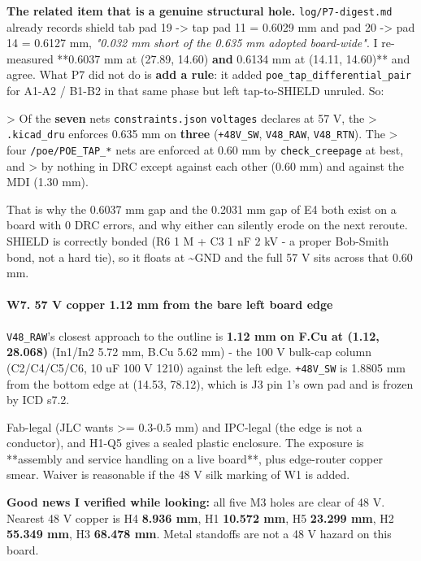 \documentclass[11pt,a4paper]{article}
\begin{document}
\textbf{The related item that is a genuine structural hole.} \texttt{log/P7-digest.md} already records shield tab pad 19 -\textgreater{} tap pad 11 = 0.6029 mm and pad 20 -\textgreater{} pad 14 = 0.6127 mm, \emph{"0.032 mm short of the 0.635 mm adopted board-wide"}. I re-measured {*}{*}0.6037 mm at (27.89, 14.60)\textbf{ and }0.6134 mm at (14.11, 14.60){*}{*} and agree. What P7 did not do is \textbf{add a rule}: it added \texttt{poe\_tap\_differential\_pair} for A1-A2 / B1-B2 in that same phase but left tap-to-SHIELD unruled. So:

\textgreater{} Of the \textbf{seven} nets \texttt{constraints.json} \texttt{voltages} declares at 57 V, the \textgreater{} \texttt{.kicad\_dru} enforces 0.635 mm on \textbf{three} (\texttt{+48V\_SW}, \texttt{V48\_RAW}, \texttt{V48\_RTN}). The \textgreater{} four \texttt{/poe/POE\_TAP\_{*}} nets are enforced at 0.60 mm by \texttt{check\_creepage} at best, and \textgreater{} by nothing in DRC except against each other (0.60 mm) and against the MDI (1.30 mm).

That is why the 0.6037 mm gap and the 0.2031 mm gap of E4 both exist on a board with 0 DRC errors, and why either can silently erode on the next reroute. SHIELD is correctly bonded (R6 1 M + C3 1 nF 2 kV - a proper Bob-Smith bond, not a hard tie), so it floats at \textasciitilde{}GND and the full 57 V sits across that 0.60 mm.

\paragraph*{W7. 57 V copper 1.12 mm from the bare left board edge}
\texttt{V48\_RAW}'s closest approach to the outline is \textbf{1.12 mm on F.Cu at (1.12, 28.068)} (In1/In2 5.72 mm, B.Cu 5.62 mm) - the 100 V bulk-cap column (C2/C4/C5/C6, 10 uF 100 V 1210) against the left edge. \texttt{+48V\_SW} is 1.8805 mm from the bottom edge at (14.53, 78.12), which is J3 pin 1's own pad and is frozen by ICD s7.2.

Fab-legal (JLC wants \textgreater{}= 0.3-0.5 mm) and IPC-legal (the edge is not a conductor), and H1-Q5 gives a sealed plastic enclosure. The exposure is {*}{*}assembly and service handling on a live board{*}{*}, plus edge-router copper smear. Waiver is reasonable if the 48 V silk marking of W1 is added.

\textbf{Good news I verified while looking:} all five M3 holes are clear of 48 V. Nearest 48 V copper is H4 \textbf{8.936 mm}, H1 \textbf{10.572 mm}, H5 \textbf{23.299 mm}, H2 \textbf{55.349 mm}, H3 \textbf{68.478 mm}. Metal standoffs are not a 48 V hazard on this board.
\end{document}

